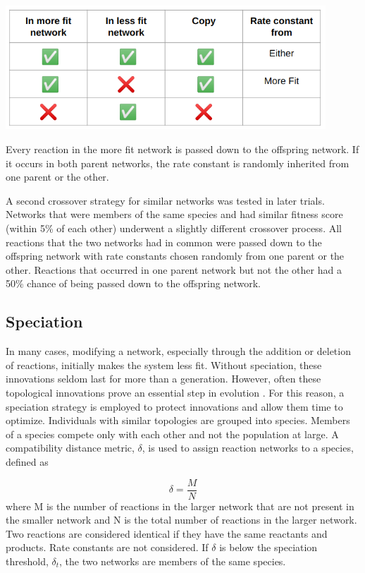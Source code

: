 \documentclass[12pt]{report}
\begin{document}
\begin{table}
	\centering
    \includegraphics[width=12cm]{images/crossover_table.png}
    \caption[Crossover procedure]{Every reaction in the more fit network is passed down to the offspring network. If it occurs in both parent networks, the rate constant is randomly inherited from one parent or the other.}
    \label{table:crossover_table}
\end{table}

A second crossover strategy for similar networks was tested in later trials. Networks that were members of the same species and had similar fitness score (within 5\% of each other) underwent a slightly different crossover process. All reactions that the two networks had in common were passed down to the offspring network with rate constants chosen randomly from one parent or the other. Reactions that occurred in one parent network but not the other had a 50\% chance of being passed down to the offspring network.

\subsection{Speciation}
In many cases, modifying a network, especially through the addition or deletion of reactions, initially makes the system less fit. Without speciation, these innovations seldom last for more than a generation. However, often these topological innovations prove an essential step in evolution \cite{stanley_evolving_2002}. For this reason, a speciation strategy is employed to protect innovations and allow them time to optimize. Individuals with similar topologies are grouped into species. Members of a species compete only with each other and not the population at large.  A compatibility distance metric, $\delta$, is used to assign reaction networks to a species, defined as

\begin{equation}
\delta=\frac{M}{N}
\end{equation}
where M is the number of reactions in the larger network that are not present in the smaller network and N is the total number of reactions in the larger network. Two reactions are considered identical if they have the same reactants and products. Rate constants are not considered. If $\delta$ is below the speciation threshold, $\delta_{t}$, the two networks are members of the same species.
\end{document}
